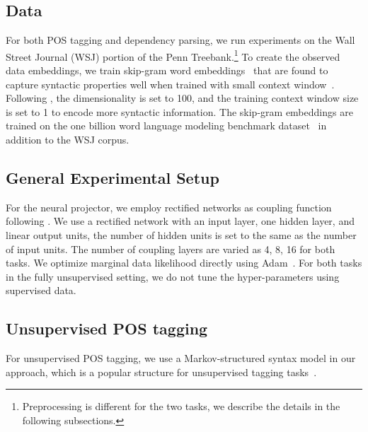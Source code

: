 \documentclass[11pt,a4paper]{article}
\begin{document}
\subsection{Data}
For both POS tagging and dependency parsing, we run experiments on the Wall Street Journal (WSJ) portion of the Penn Treebank.\footnote{Preprocessing is different for the two tasks, we describe the details in the following subsections.} To create the observed data embeddings, we train skip-gram word embeddings~\citep{mikolov2013efficient} that are found to capture syntactic properties well when trained with small context window~\citep{bansal2014tailoring, lin2015unsupervised}. Following \citet{lin2015unsupervised}, the dimensionality  is set to 100, and the training context window size is set to 1 to encode more syntactic information. The skip-gram embeddings are trained on the one billion word language modeling benchmark dataset~\citep{chelba2013one} in addition to the WSJ corpus.

\subsection{General Experimental Setup}
For the neural projector, we employ rectified networks as coupling function  following \citet{dinh2014nice}. We use a rectified network with an input layer, one hidden layer, and linear output units, the number of hidden units is set to the same as the number of input units. The number of coupling layers are varied as 4, 8, 16 for both tasks. We optimize marginal data likelihood directly using Adam~\citep{kingma2014adam}. For both tasks in the fully unsupervised setting, we do not tune the hyper-parameters using supervised data.

\subsection{Unsupervised POS tagging}
\label{sec:pos}

For unsupervised POS tagging, we use a Markov-structured syntax model in our approach, which is a popular structure for unsupervised tagging tasks~\citep{lin2015unsupervised,tran2016unsupervised}.
\end{document}
